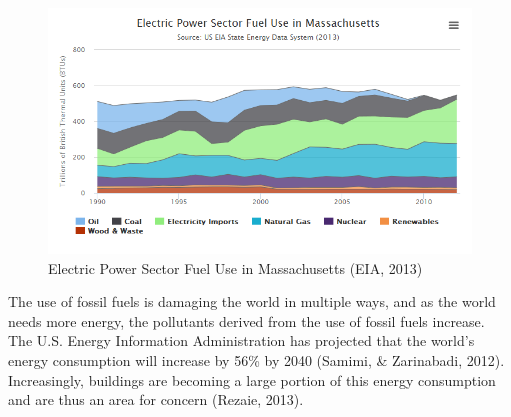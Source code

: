   \begin{figure}[H]
    \centering
      \includegraphics[width=\textwidth]{images/02-ElectricPowerSectorFuelUseinMassachusetts}
    \caption{Electric Power Sector Fuel Use in Massachusetts (EIA, 2013)}
    \label{fig:power}
  \end{figure}
  \par The use of fossil fuels is damaging the world in multiple ways, and as the world needs more energy, the pollutants derived from the use of fossil fuels increase. The U.S. Energy Information Administration has projected that the world's energy consumption will increase by 56\% by 2040 (Samimi, \& Zarinabadi, 2012). Increasingly, buildings are becoming a large portion of this energy consumption and are thus an area for concern (Rezaie, 2013).


